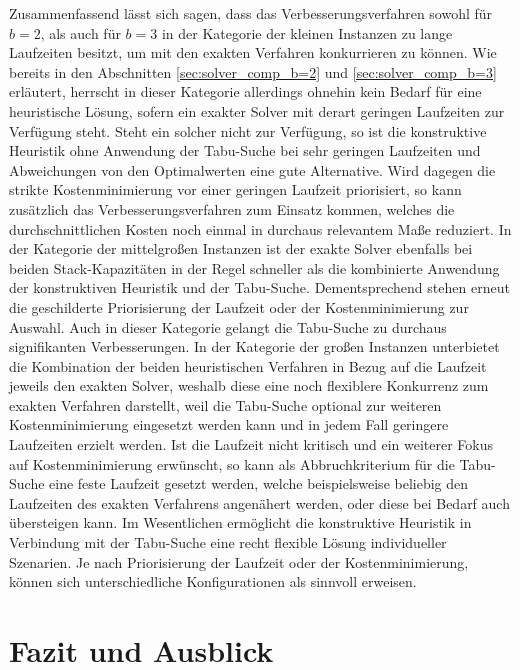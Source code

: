 Zusammenfassend lässt sich sagen, dass das Verbesserungsverfahren sowohl für $b = 2$,
als auch für $b = 3$ in der Kategorie der kleinen Instanzen zu lange Laufzeiten besitzt,
um mit den exakten Verfahren konkurrieren zu können.
Wie bereits in den Abschnitten \ref{sec:solver_comp_b=2} und \ref{sec:solver_comp_b=3} erläutert,
herrscht in dieser Kategorie allerdings ohnehin kein Bedarf für eine heuristische Lösung,
sofern ein exakter Solver mit derart geringen Laufzeiten zur Verfügung steht.
Steht ein solcher nicht zur Verfügung, so ist die konstruktive Heuristik ohne Anwendung der
Tabu-Suche bei sehr geringen Laufzeiten und Abweichungen von den Optimalwerten eine gute Alternative.
Wird dagegen die strikte Kostenminimierung vor einer geringen Laufzeit priorisiert, so kann zusätzlich das Verbesserungsverfahren zum Einsatz kommen, welches die durchschnittlichen Kosten noch einmal in durchaus
relevantem Maße reduziert.
In der Kategorie der mittelgroßen Instanzen ist der exakte Solver ebenfalls bei beiden Stack-Kapazitäten
in der Regel schneller als die kombinierte Anwendung der konstruktiven Heuristik und der Tabu-Suche.
Dementsprechend stehen erneut die geschilderte Priorisierung der Laufzeit oder der Kostenminimierung zur
Auswahl. Auch in dieser Kategorie gelangt die Tabu-Suche zu durchaus signifikanten Verbesserungen.
In der Kategorie der großen Instanzen unterbietet die Kombination der beiden heuristischen Verfahren
in Bezug auf die Laufzeit jeweils den exakten Solver, weshalb diese eine noch flexiblere Konkurrenz
zum exakten Verfahren darstellt, weil die Tabu-Suche optional zur weiteren Kostenminimierung eingesetzt werden
kann und in jedem Fall geringere Laufzeiten erzielt werden. Ist die Laufzeit nicht kritisch und ein weiterer
Fokus auf Kostenminimierung erwünscht, so kann als Abbruchkriterium für die Tabu-Suche eine feste Laufzeit
gesetzt werden, welche beispielsweise beliebig den Laufzeiten des exakten Verfahrens angenähert werden,
oder diese bei Bedarf auch übersteigen kann. Im Wesentlichen ermöglicht die konstruktive Heuristik in
Verbindung mit der Tabu-Suche eine recht flexible Lösung individueller Szenarien. Je nach Priorisierung
der Laufzeit oder der Kostenminimierung, können sich unterschiedliche Konfigurationen als sinnvoll erweisen.

\vfill
\pagebreak

\section{Fazit und Ausblick}
\label{sec:conclusion}

